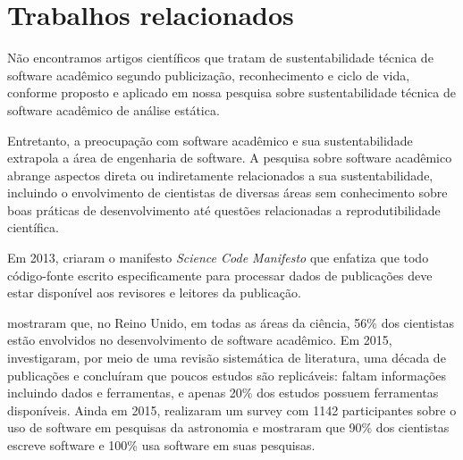 

\section{Trabalhos relacionados}
\label{sec:trabalhosrelacionados}


Não encontramos artigos científicos que tratam de sustentabilidade técnica
de software acadêmico segundo publicização, reconhecimento e ciclo de vida,
conforme proposto e aplicado em nossa pesquisa sobre sustentabilidade
técnica de software acadêmico de análise estática.

Entretanto, a preocupação com software acadêmico e sua sustentabilidade
extrapola a área de engenharia de software.
A pesquisa sobre software acadêmico abrange aspectos 
direta ou indiretamente relacionados a sua sustentabilidade,
incluindo o envolvimento de cientistas de diversas áreas sem conhecimento
sobre boas práticas de desenvolvimento até 
questões relacionadas a reprodutibilidade científica.

Em 2013, 
criaram o manifesto {\it Science Code Manifesto} que enfatiza que todo código-fonte
escrito especificamente para processar dados de publicações deve estar
disponível aos revisores e leitores da publicação.

 mostraram que, no Reino Unido, em todas as áreas da
ciência, 56\% dos cientistas estão envolvidos no desenvolvimento de software
acadêmico. 
Em 2015, 
investigaram, por meio de uma revisão sistemática de literatura, uma década de
publicações e concluíram que poucos estudos são replicáveis:
faltam informações incluindo dados e ferramentas, e apenas 20\% dos estudos
possuem ferramentas disponíveis.
Ainda em 2015,  realizaram
um survey com 1142 participantes sobre o uso de software em pesquisas da
astronomia e mostraram que 90\% dos cientistas escreve software e 100\% usa
software em suas pesquisas.

